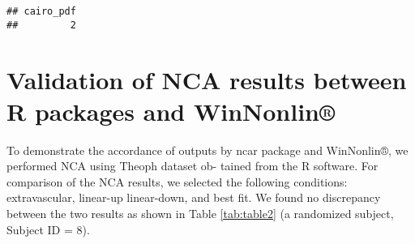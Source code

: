 \documentclass[12pt,]{krantz}
\theoremstyle{definition}
\theoremstyle{definition}
\theoremstyle{definition}
\theoremstyle{remark}
\begin{document}
\begin{verbatim}
## cairo_pdf 
##         2
\end{verbatim}

\hypertarget{validation-of-nca-results-between-r-packages-and-winnonlin}{%
\section{Validation of NCA results between R packages and
WinNonlin®}\label{validation-of-nca-results-between-r-packages-and-winnonlin}}

To demonstrate the accordance of outputs by ncar package and WinNonlin®,
we performed NCA using Theoph dataset ob- tained from the R software.
For comparison of the NCA results, we selected the following conditions:
extravascular, linear-up linear-down, and best fit. We found no
discrepancy between the two results as shown in Table \ref{tab:table2}
(a randomized subject, Subject ID = 8).
\end{document}
